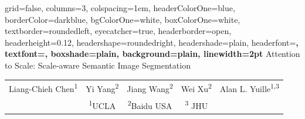 \documentclass[landscape,final,a0paper,fontscale=0.285]{baposter}
\begin{document}
\begin{poster}%
  {
  grid=false,
  columns=3,
  colspacing=1em,
  headerColorOne=blue,
  borderColor=darkblue,
  bgColorOne=white,
  boxColorOne=white,
  textborder=roundedleft,
  eyecatcher=true,
  headerborder=open, %
  headerheight=0.12\textheight,
  headershape=roundedright,
  headershade=plain, %
  headerfont=\Large\bf\textsc, %
  textfont={\setlength{\parindent}{1.5em}},
  boxshade=plain,
  background=plain,
  linewidth=2pt
  }
  {}
  { {\huge Attention to Scale: Scale-aware Semantic Image Segmentation} }
  { \vspace{0.3cm} {\Large
      \begin{tabular}{ccccc} 
        Liang-Chieh Chen\textsuperscript{1} & Yi Yang\textsuperscript{2} & Jiang Wang\textsuperscript{2} & Wei Xu\textsuperscript{2} & Alan L. Yuille\textsuperscript{1,3} \\
      & \textsuperscript{1}UCLA & \textsuperscript{2}Baidu USA & \textsuperscript{3} JHU
    \end{tabular} }
  }
  {}%

  \newcommand{\colouredcircle}{%
    \tikz{\useasboundingbox (-0.2em,-0.32em) rectangle(0.2em,0.32em); \draw[draw=black,fill=lightblue,line width=0.03em] (0,0) circle(0.18em);}}


\end{poster}
\end{document}
